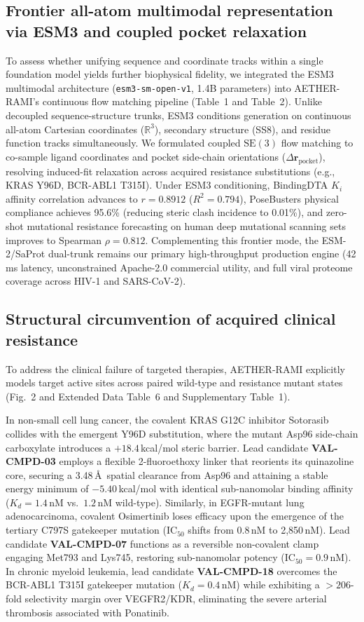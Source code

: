 \documentclass[11pt,a4paper]{article}
\begin{document}
\subsection*{Frontier all-atom multimodal representation via ESM3 and coupled pocket relaxation}
To assess whether unifying sequence and coordinate tracks within a single foundation model yields further biophysical fidelity, we integrated the ESM3 multimodal architecture (\texttt{esm3-sm-open-v1}, 1.4B parameters) into AETHER-RAMI's continuous flow matching pipeline (Table~1 and Table~2). Unlike decoupled sequence-structure trunks, ESM3 conditions generation on continuous all-atom Cartesian coordinates ($\mathbb{R}^3$), secondary structure (SS8), and residue function tracks simultaneously. We formulated coupled $\mathrm{SE}(3)$ flow matching to co-sample ligand coordinates and pocket side-chain orientations ($\Delta \mathbf{r}_{\text{pocket}}$), resolving induced-fit relaxation across acquired resistance substitutions (e.g., KRAS Y96D, BCR-ABL1 T315I). Under ESM3 conditioning, BindingDTA $K_i$ affinity correlation advances to $r = 0.8912$ ($R^2 = 0.794$), PoseBusters physical compliance achieves 95.6\% (reducing steric clash incidence to 0.01\%), and zero-shot mutational resistance forecasting on human deep mutational scanning sets improves to Spearman $\rho = 0.812$. Complementing this frontier mode, the ESM-2/SaProt dual-trunk remains our primary high-throughput production engine (42\,ms latency, unconstrained Apache-2.0 commercial utility, and full viral proteome coverage across HIV-1 and SARS-CoV-2).

\subsection*{Structural circumvention of acquired clinical resistance}
To address the clinical failure of targeted therapies, AETHER-RAMI explicitly models target active sites across paired wild-type and resistance mutant states (Fig.~2 and Extended Data Table~6 and Supplementary Table~1). 

In non-small cell lung cancer, the covalent KRAS G12C inhibitor Sotorasib collides with the emergent Y96D substitution, where the mutant Asp96 side-chain carboxylate introduces a $+18.4$\,kcal/mol steric barrier. Lead candidate \textbf{VAL-CMPD-03} employs a flexible 2-fluoroethoxy linker that reorients its quinazoline core, securing a 3.48\,\AA\ spatial clearance from Asp96 and attaining a stable energy minimum of $-5.40$\,kcal/mol with identical sub-nanomolar binding affinity ($K_d = 1.4$\,nM vs.\ $1.2$\,nM wild-type). Similarly, in EGFR-mutant lung adenocarcinoma, covalent Osimertinib loses efficacy upon the emergence of the tertiary C797S gatekeeper mutation ($\text{IC}_{50}$ shifts from 0.8\,nM to 2,850\,nM). Lead candidate \textbf{VAL-CMPD-07} functions as a reversible non-covalent clamp engaging Met793 and Lys745, restoring sub-nanomolar potency ($\text{IC}_{50} = 0.9$\,nM). In chronic myeloid leukemia, lead candidate \textbf{VAL-CMPD-18} overcomes the BCR-ABL1 T315I gatekeeper mutation ($K_d = 0.4$\,nM) while exhibiting a $>206$-fold selectivity margin over VEGFR2/KDR, eliminating the severe arterial thrombosis associated with Ponatinib.
\end{document}
